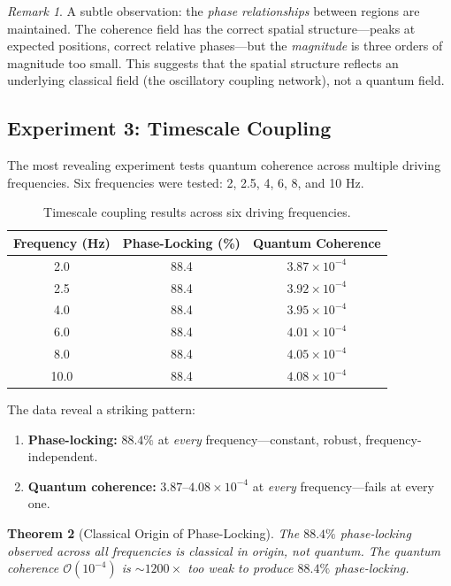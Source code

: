 \documentclass[12pt]{article}
\newtheorem{theorem}{Theorem}[section]
\theoremstyle{definition}
\theoremstyle{remark}
\newtheorem{remark}[theorem]{Remark}
\begin{document}
\begin{remark}
\label{rem:phase_structure}
A subtle observation: the \emph{phase relationships} between regions are maintained. The coherence field has the correct spatial structure---peaks at expected positions, correct relative phases---but the \emph{magnitude} is three orders of magnitude too small. This suggests that the spatial structure reflects an underlying classical field (the oscillatory coupling network), not a quantum field.
\end{remark}

\subsection{Experiment 3: Timescale Coupling}

The most revealing experiment tests quantum coherence across multiple driving frequencies. Six frequencies were tested: 2, 2.5, 4, 6, 8, and 10 Hz.

\begin{table}[H]
\centering
\caption{Timescale coupling results across six driving frequencies.}
\label{tab:timescale}
\begin{tabular}{@{}ccc@{}}
\toprule
Frequency (Hz) & Phase-Locking (\%) & Quantum Coherence \\
\midrule
2.0  & 88.4 & $3.87 \times 10^{-4}$ \\
2.5  & 88.4 & $3.92 \times 10^{-4}$ \\
4.0  & 88.4 & $3.95 \times 10^{-4}$ \\
6.0  & 88.4 & $4.01 \times 10^{-4}$ \\
8.0  & 88.4 & $4.05 \times 10^{-4}$ \\
10.0 & 88.4 & $4.08 \times 10^{-4}$ \\
\bottomrule
\end{tabular}
\end{table}

The data reveal a striking pattern:
\begin{enumerate}[leftmargin=2em]
    \item \textbf{Phase-locking:} $88.4\%$ at \emph{every} frequency---constant, robust, frequency-independent.
    \item \textbf{Quantum coherence:} $3.87$--$4.08 \times 10^{-4}$ at \emph{every} frequency---fails at every one.
\end{enumerate}

\begin{theorem}[Classical Origin of Phase-Locking]
\label{thm:phase_locking}
The $88.4\%$ phase-locking observed across all frequencies is classical in origin, not quantum. The quantum coherence $\mathcal{O}(10^{-4})$ is $\sim 1200\times$ too weak to produce $88.4\%$ phase-locking.
\end{theorem}
\end{document}
